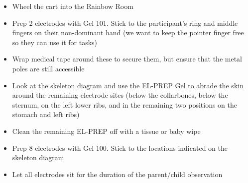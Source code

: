 \documentclass[]{book}
\providecommand{\tightlist}{%
  \setlength{\itemsep}{0pt}\setlength{\parskip}{0pt}}
\begin{document}
\begin{itemize}
\tightlist
\item
  Wheel the cart into the Rainbow Room
\item
  Prep 2 electrodes with Gel 101. Stick to the participant's ring and middle fingers on their non-dominant hand (we want to keep the pointer finger free so they can use it for tasks)
\item
  Wrap medical tape around these to secure them, but ensure that the metal poles are still accessible
\item
  Look at the skeleton diagram and use the EL-PREP Gel to abrade the skin around the remaining electrode sites (below the collarbones, below the sternum, on the left lower ribs, and in the remaining two positions on the stomach and left ribs)
\item
  Clean the remaining EL-PREP off with a tissue or baby wipe
\item
  Prep 8 electrodes with Gel 100. Stick to the locations indicated on the skeleton diagram
\item
  Let all electrodes sit for the duration of the parent/child observation
\end{itemize}
\end{document}

